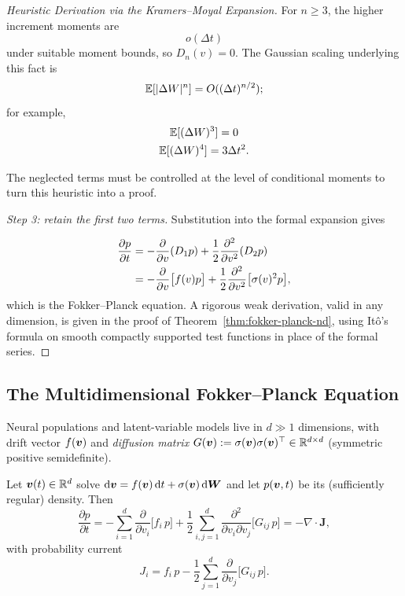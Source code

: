 \begin{proof}[Heuristic Derivation via the Kramers--Moyal Expansion]
For $n\ge3$, the higher increment moments are
\[
o(\Delta t)
\]
 under suitable moment bounds, so $D_n(v)=0$. The Gaussian scaling underlying this fact is
\[
\operatorname{\mathbb{E}}[|\Delta W|^n]=O((\Delta t)^{n/2});
\]
for example,
\[
\begin{gathered}
\operatorname{\mathbb{E}}[(\Delta W)^3]=0 \\
\operatorname{\mathbb{E}}[(\Delta W)^4]=3\Delta t^2.
\end{gathered}
\]

The neglected terms must be controlled at the level of conditional moments to turn this heuristic into a proof.

\textit{Step 3: retain the first two terms.} Substitution into the formal expansion gives

\begin{align}
\frac{\partial p}{\partial t}
&=-\frac{\partial}{\partial v}(D_1p)
+\frac12\frac{\partial^2}{\partial v^2}(D_2p)\notag\\
&=-\frac{\partial}{\partial v}\big[f(v)p\big]
+\frac12\frac{\partial^2}{\partial v^2}\big[\sigma(v)^2p\big],
\end{align}
which is the Fokker--Planck equation. A rigorous weak derivation, valid in any dimension, is given in the proof of Theorem~\ref{thm:fokker-planck-nd}, using It\^o's formula on smooth compactly supported test functions in place of the formal series.
\end{proof}

\subsection{The Multidimensional Fokker--Planck Equation}
\label{sec:fokker-planck-nd}

Neural populations and latent-variable models live in $d\gg1$ dimensions, with drift vector $f(\bm{v})$ and \emph{diffusion matrix} $G(\bm{v}):=\sigma(\bm{v})\sigma(\bm{v})^{\top}\in\mathbb{R}^{d\times d}$ (symmetric positive semidefinite).

\begin{theorem}
\label{thm:fokker-planck-nd}
Let $\bm{v}(t)\in\mathbb{R}^d$ solve $\mathrm{d}\bm{v}=f(\bm{v})\,\mathrm{d} t+\sigma(\bm{v})\,\mathrm{d}\bm{W}$ and let $p(\bm{v},t)$ be its (sufficiently regular) density. Then
\begin{equation}
\label{eq:fp-nd}
\frac{\partial p}{\partial t}
=-\sum_{i=1}^d\frac{\partial}{\partial v_i}\big[f_i\,p\big]
+\frac12\sum_{i,j=1}^d\frac{\partial^2}{\partial v_i\partial v_j}\big[G_{ij}\,p\big]
=-\nabla\!\cdot\!\bm J,
\end{equation}
with probability current
\begin{equation}
\label{eq:current-nd}
J_i=f_i\,p-\frac12\sum_{j=1}^d\frac{\partial}{\partial v_j}\big[G_{ij}\,p\big].
\end{equation}
\end{theorem}

